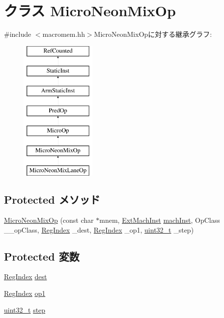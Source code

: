 \hypertarget{classArmISA_1_1MicroNeonMixOp}{
\section{クラス MicroNeonMixOp}
\label{classArmISA_1_1MicroNeonMixOp}
}


{\ttfamily \#include $<$macromem.hh$>$}MicroNeonMixOpに対する継承グラフ:\begin{figure}[H]
\begin{center}
\leavevmode
\includegraphics[height=7cm]{classArmISA_1_1MicroNeonMixOp}
\end{center}
\end{figure}
\subsection*{Protected メソッド}
\begin{DoxyCompactItemize}
\item 
\hyperlink{classArmISA_1_1MicroNeonMixOp_a36be9fd8ff3c4724827aa6d7be82356c}{MicroNeonMixOp} (const char $\ast$mnem, \hyperlink{classStaticInst_a5605d4fc727eae9e595325c90c0ec108}{ExtMachInst} \hyperlink{classStaticInst_a744598b194ca3d4201d9414ce4cc4af4}{machInst}, OpClass \_\-\_\-opClass, \hyperlink{classStaticInst_a36d25e03e43fa3bb4c5482cbefe5e0fb}{RegIndex} \_\-dest, \hyperlink{classStaticInst_a36d25e03e43fa3bb4c5482cbefe5e0fb}{RegIndex} \_\-op1, \hyperlink{Type_8hh_a435d1572bf3f880d55459d9805097f62}{uint32\_\-t} \_\-step)
\end{DoxyCompactItemize}
\subsection*{Protected 変数}
\begin{DoxyCompactItemize}
\item 
\hyperlink{classStaticInst_a36d25e03e43fa3bb4c5482cbefe5e0fb}{RegIndex} \hyperlink{classArmISA_1_1MicroNeonMixOp_a6563276134c2f303bab0c30e83e02220}{dest}
\item 
\hyperlink{classStaticInst_a36d25e03e43fa3bb4c5482cbefe5e0fb}{RegIndex} \hyperlink{classArmISA_1_1MicroNeonMixOp_ae55982e6b9309683aef1b44249ab406f}{op1}
\item 
\hyperlink{Type_8hh_a435d1572bf3f880d55459d9805097f62}{uint32\_\-t} \hyperlink{classArmISA_1_1MicroNeonMixOp_a739c65d9c925e3793560160ef5a96d6f}{step}
\end{DoxyCompactItemize}


